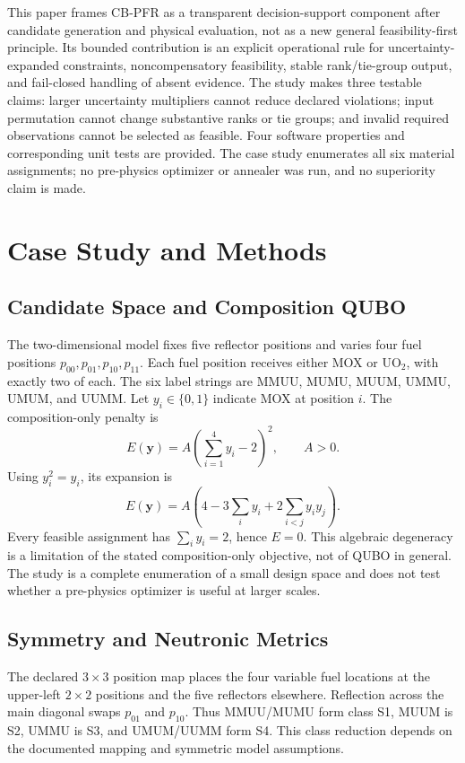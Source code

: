 \documentclass[conference]{IEEEtran}
\begin{document}
This paper frames CB-PFR as a transparent decision-support component after candidate generation and physical evaluation, not as a new general feasibility-first principle. Its bounded contribution is an explicit operational rule for uncertainty-expanded constraints, noncompensatory feasibility, stable rank/tie-group output, and fail-closed handling of absent evidence. The study makes three testable claims: larger uncertainty multipliers cannot reduce declared violations; input permutation cannot change substantive ranks or tie groups; and invalid required observations cannot be selected as feasible. Four software properties and corresponding unit tests are provided. The case study enumerates all six material assignments; no pre-physics optimizer or annealer was run, and no superiority claim is made.

\section{Case Study and Methods}
\subsection{Candidate Space and Composition QUBO}
The two-dimensional model fixes five reflector positions and varies four fuel positions \(p_{00},p_{01},p_{10},p_{11}\). Each fuel position receives either MOX or UO$_2$, with exactly two of each. The six label strings are MMUU, MUMU, MUUM, UMMU, UMUM, and UUMM. Let \(y_i\in\{0,1\}\) indicate MOX at position \(i\). The composition-only penalty is
\begin{equation}
E(\mathbf y)=A\left(\sum_{i=1}^{4}y_i-2\right)^2,\qquad A>0.
\label{eq:qubo}
\end{equation}
Using \(y_i^2=y_i\), its expansion is
\begin{equation}
E(\mathbf y)=A\left(4-3\sum_i y_i+2\sum_{i<j}y_iy_j\right).
\end{equation}
Every feasible assignment has \(\sum_i y_i=2\), hence \(E=0\). This algebraic degeneracy is a limitation of the stated composition-only objective, not of QUBO in general. The study is a complete enumeration of a small design space and does not test whether a pre-physics optimizer is useful at larger scales.

\subsection{Symmetry and Neutronic Metrics}
The declared \(3\times3\) position map places the four variable fuel locations at the upper-left \(2\times2\) positions and the five reflectors elsewhere. Reflection across the main diagonal swaps \(p_{01}\) and \(p_{10}\). Thus MMUU/MUMU form class S1, MUUM is S2, UMMU is S3, and UMUM/UUMM form S4. This class reduction depends on the documented mapping and symmetric model assumptions.
\end{document}
